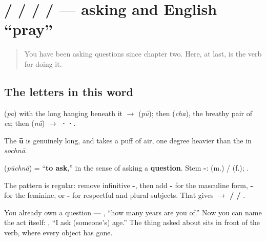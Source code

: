 \section[\texorpdfstring{\hi{पूछना} / \hi{पूछ} / \hi{पूछता} … (pūchnā / pūch …)}{पूछना / पूछ / पूछता … (pūchnā / pūch …)}]{ /  /  /  /  — asking and English \textquotedblleft{}pray\textquotedblright{}}

\label{lesson:HI-C35-puchna}



\begin{quote}
You have been asking questions since chapter two. Here, at last, is the verb for doing it.
\end{quote}

\subsection*{The letters in this word}
\textbf{} (\emph{pa}) with the long \textbf{} hanging beneath it $\to$ \textbf{} (\emph{pū}); then \textbf{} (\emph{cha}), the breathy pair of \emph{ca}; then \textbf{} (\emph{nā}) $\to$ \textbf{··}.

The \textbf{ū} is genuinely long, and \textbf{} takes a puff of air, one degree heavier than the \textbf{} in \emph{sochnā}.

\begin{cousinweb}
\textbf{} (\emph{pūchnā}) = \textquotedblleft{}\textbf{to ask},\textquotedblright{} in the sense of asking a \textbf{question}. Stem \textbf{-}: \textbf{  } (m.) / \textbf{  } (f.); \textbf{  }.

The pattern is regular: remove infinitive \textbf{-}, then add \textbf{-} for the masculine form, \textbf{-} for the feminine, or \textbf{-} for respectful \textbf{} and plural subjects. That gives \textbf{ $\to$  /  / }.

You already own a question — \textbf{   }, \textquotedblleft{}how many years are you of.\textquotedblright{} Now you can name the act itself: \textbf{   }, \textquotedblleft{}I ask (someone's) age.\textquotedblright{} The thing asked about sits in front of the verb, where every object has gone.
\end{cousinweb}

